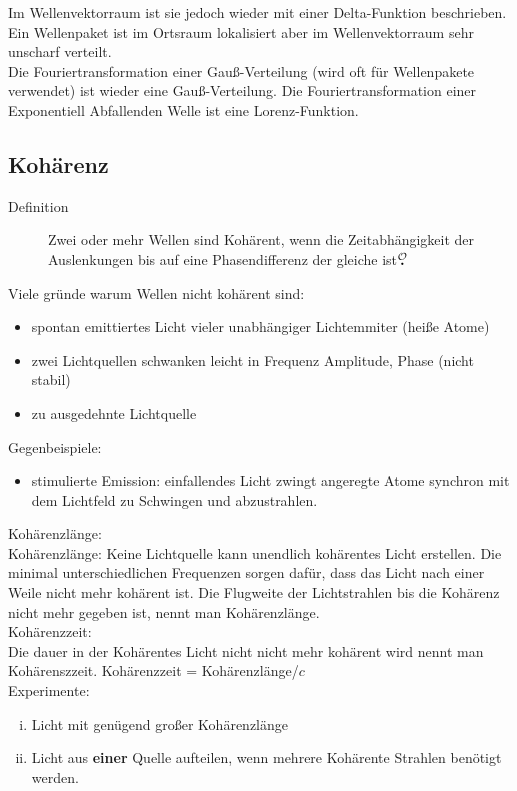 \documentclass[titlepage,11pt,a4paper,ngerman]{report}
\newcommand{\lcom}[1]{\color{MidnightBlue}#1\color{black}}
\newcommand{\mau}{$\buildrel \mathcal{O} \over{\textbf{.}}$}
\begin{document}
\noindent
\lcom{Im Wellenvektorraum ist sie jedoch wieder mit einer Delta-Funktion beschrieben. Ein Wellenpaket ist im Ortsraum lokalisiert aber im Wellenvektorraum sehr unscharf verteilt.}\\
\lcom{Die Fouriertransformation einer Gauß-Verteilung (wird oft für Wellenpakete verwendet) ist wieder eine Gauß-Verteilung. Die Fouriertransformation einer Exponentiell Abfallenden Welle ist eine Lorenz-Funktion.}
\subsection{Kohärenz}
\begin{description}
	\item[Definition] Zwei oder mehr Wellen sind Kohärent, wenn die Zeitabhängigkeit der Auslenkungen bis auf eine Phasendifferenz der gleiche ist\mau
\end{description}
Viele gründe warum Wellen nicht kohärent sind:
\begin{itemize}
	\item spontan emittiertes Licht vieler unabhängiger Lichtemmiter (heiße Atome)
	\item zwei Lichtquellen schwanken leicht in Frequenz Amplitude, Phase (nicht stabil)
	\item zu ausgedehnte Lichtquelle
\end{itemize}
Gegenbeispiele:
\begin{itemize}
	\item stimulierte Emission: einfallendes Licht zwingt angeregte Atome synchron mit dem Lichtfeld zu Schwingen und abzustrahlen.
\end{itemize}
Kohärenzlänge:\\
\lcom{Kohärenzlänge: Keine Lichtquelle kann unendlich kohärentes Licht erstellen. Die minimal unterschiedlichen Frequenzen sorgen dafür, dass das Licht nach einer Weile nicht mehr kohärent ist. Die Flugweite der Lichtstrahlen bis die Kohärenz nicht mehr gegeben ist, nennt man Kohärenzlänge.}\\
Kohärenzzeit:\\
\lcom{Die dauer in der Kohärentes Licht nicht nicht mehr kohärent wird nennt man Kohärenszzeit. }
Kohärenzzeit = Kohärenzlänge/$c$\\
Experimente: 
\begin{enumerate}[(i)]
	\item Licht mit genügend großer Kohärenzlänge
	\item Licht aus \textbf{einer} Quelle aufteilen, wenn mehrere Kohärente Strahlen benötigt werden.
\end{enumerate}
\end{document}
